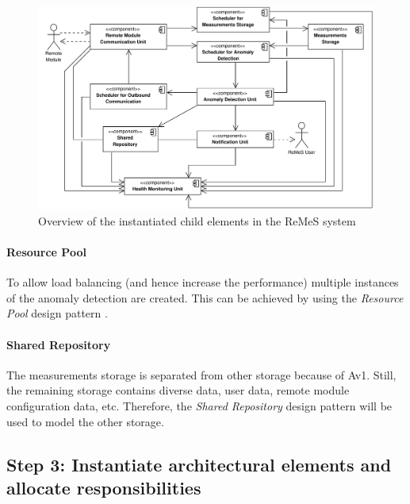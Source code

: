 \begin{figure}[H]
	\begin{centering}
		\includegraphics[width=1.2\textwidth,angle=90]{figs/add-it1-elements.pdf}
		\caption{Overview of the instantiated child elements in the ReMeS system}
		\label{fig:it1/elements}
	\end{centering}
\end{figure}

\paragraph{Resource Pool}

\npar To allow load balancing (and hence increase the performance) multiple
instances of the anomaly detection are created. This can be achieved by using
the \emph{Resource Pool} design pattern \citep[see][p.~503]{Buschmann:07}. 

\paragraph{Shared Repository}

\npar The measurements storage is separated from other storage because of Av1.
Still, the remaining storage contains diverse data, user data, remote module
configuration data, etc. Therefore, the \emph{Shared Repository} design pattern
\citep[see][p.~202]{Buschmann:07} will be used to model the other storage.

\subsection{Step 3: Instantiate architectural elements and allocate responsibilities}
\label{add:it1/elements}


